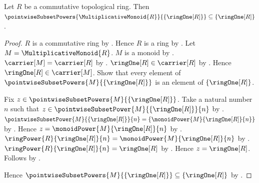 \begin{proposition}\label{topological_ring_one_power_envelope}
    Let $R$ be a commutative topological ring.
    Then $\pointwiseSubsetPowers{\MultiplicativeMonoid{R}}{
        \{\ringOne[R]\}}\subseteq\{\ringOne[R]\}$.
\end{proposition}
\begin{proof}
    $R$ is a commutative ring by
        .
    Hence $R$ is a ring by .
    Let $M=\MultiplicativeMonoid{R}$.
    $M$ is a monoid by .
    $\carrier[M]=\carrier[R]$ by .
    $\ringOne[R]\in\carrier[R]$ by .
    Hence $\ringOne[R]\in\carrier[M]$.
    Show that every element of
        $\pointwiseSubsetPowers{M}{\{\ringOne[R]\}}$ is an element of
        $\{\ringOne[R]\}$.
    \begin{subproof}
        Fix $z\in\pointwiseSubsetPowers{M}{\{\ringOne[R]\}}$.
        Take a natural number $n$ such that
            $z\in\pointwiseSubsetPower{M}{\{\ringOne[R]\}}{n}$ by
            .
        $\pointwiseSubsetPower{M}{\{\ringOne[R]\}}{n}
            =\{\monoidPower{M}{\ringOne[R]}{n}\}$ by
            .
        Hence $z=\monoidPower{M}{\ringOne[R]}{n}$ by
            .
        $\ringPower{R}{\ringOne[R]}{n}
            =\monoidPower{M}{\ringOne[R]}{n}$ by .
        $\ringPower{R}{\ringOne[R]}{n}=\ringOne[R]$ by
            .
        Hence $z=\ringOne[R]$.
        Follows by .
    \end{subproof}
    Hence $\pointwiseSubsetPowers{M}{\{\ringOne[R]\}}
        \subseteq\{\ringOne[R]\}$ by .
\end{proof}

